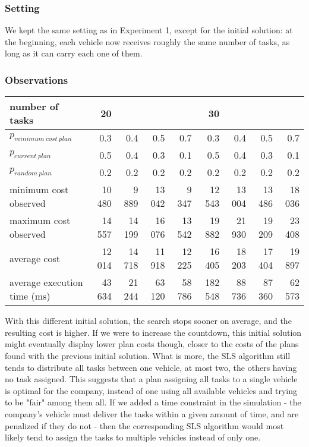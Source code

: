 \documentclass[10pt]{article}
\begin{document}
\subsubsection{Setting}
We kept the same setting as in Experiment 1, except for the initial solution: at the beginning, each vehicle now receives roughly the same number of tasks, as long as it can carry each one of them.

\subsubsection{Observations}

\begin{tabular}{|l|rrrr|rrrr|}
\hline
number of tasks & 20 & & & & 30 & & & \\
\hline
$p_{minimum\ cost\ plan}$ & 0.3 & 0.4 & 0.5 & 0.7 & 0.3 & 0.4 & 0.5 & 0.7\\
$p_{current\ plan}$       & 0.5 & 0.4 & 0.3 & 0.1 & 0.5 & 0.4 & 0.3 & 0.1\\
$p_{random\ plan}$        & 0.2 & 0.2 & 0.2 & 0.2 & 0.2 & 0.2 & 0.2 & 0.2\\
\hline
minimum cost observed & 10 480 &  9 889 & 13 042 &  9 347 & 12 543 & 13 004 & 13 486 & 18 036\\
maximum cost observed & 14 557 & 14 199 & 16 076 & 13 542 & 19 882 & 21 930 & 19 209 & 23 408\\
\hline
average cost                & 12 014 & 14 718 & 11 918 & 12 225 &  16 405 & 18 203 & 17 404 & 19 897\\
average execution time (ms) & 43 634 & 21 244 & 63 120 & 58 786 & 182 548 & 88 736 & 87 360 & 62 573\\
\hline
\end{tabular}
\label{table:model_parameters_2}
\vspace{4mm}

With this different initial solution, the search stops sooner on average, and the resulting cost is higher. If we were to increase the countdown, this initial solution might eventually display lower plan costs though, closer to the costs of the plans found with the previous initial solution.
What is more, the SLS algorithm still tends to distribute all tasks between one vehicle, at most two, the others having no task assigned.
This suggests that a plan assigning all tasks to a single vehicle is optimal for the company, instead of one using all available vehicles and trying to be "fair" among them all.
If we added a time constraint in the simulation - the company's vehicle must deliver the tasks within a given amount of time, and are penalized if they do not - then the corresponding SLS algorithm would most likely tend to assign the tasks to multiple vehicles instead of only one.
\end{document}
